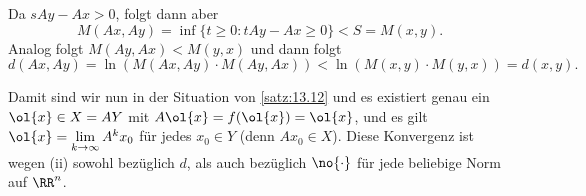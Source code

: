\begin{beweis}
\begin{enumerate}[(i)]
		Da $sAy-Ax > 0$, folgt dann aber
		\[
			M(Ax,Ay) = \inf\{t \geq 0 : tAy-Ax \geq 0\} < S = M(x,y).
		\]
		Analog folgt $M(Ay,Ax) < M(y,x)$ und dann folgt
		\[
			d(Ax,Ay) = \ln(M(Ax,Ay) \cdot M(Ay,Ax)) < \ln(M(x,y) \cdot M(y,x)) = d(x,y).
		\]
	
		Damit sind wir nun in der Situation von \autoref{satz:13.12} und es existiert genau ein $\ol{x} \in X = AY$ mit $A\ol{x} = f(\ol{x}) = \ol{x}$, und es gilt $\ol{x} = \lim\limits_{k\rightarrow \infty} A^k x_0$ für jedes $x_0 \in Y$ (denn $Ax_0 \in X$).
		Diese Konvergenz ist wegen (ii) sowohl bezüglich $d$, als auch bezüglich $\no{\cdot}$ für jede beliebige Norm auf $\RR^n$. 
	\end{enumerate}
\end{beweis}